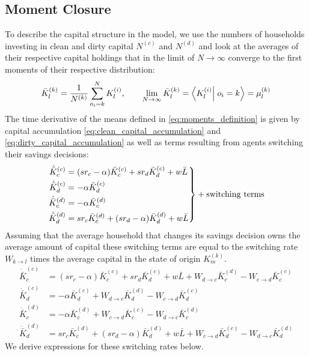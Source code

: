 \subsection{Moment Closure}

To describe the capital structure in the model, we use the numbers of households investing in clean and dirty capital $N^{(c)}$ and $N^{(d)}$ and look at the averages of their respective capital holdings that in the limit of $N \rightarrow \infty$ converge to the first moments of their respective distribution:
\begin{align}
	\bar{K}_l^{(k)} = \frac{1}{N^{(k)}}\sum_{o_i=k}^{N}K_l^{(i)}, \qquad \lim_{N \rightarrow \infty} \bar{K}_{l}^{(k)} = \braket{K_l^{(i)}}{o_i = k} = \mu_l^{(k)}
	\label{eq:moments_definition}
\end{align}
The time derivative of the means defined in \eqref{eq:moments_definition} is given by capital accumulation \eqref{eq:clean_capital_accumulation} and \eqref{eq:dirty_capital_accumulation} as well as terms resulting from agents switching their savings decisions: 
\begin{equation}
\left.  \begin{aligned}
		\dot{\bar{K}}_c^{(c)} &= (sr_c - \alpha)\bar{K}_c^{(c)} + s r_d \bar{K}_d^{(c)} + w \bar{L} \nonumber \\
		\dot{\bar{K}}_d^{(c)} &= - \alpha\bar{K}_d^{(c)} \nonumber \\
		\dot{\bar{K}}_c^{(d)} &= - \alpha\bar{K}_c^{(d)} \nonumber \\
		\dot{\bar{K}}_d^{(d)} &= sr_c \bar{K}_c^{(d)} + (s r_d - \alpha)\bar{K}_d^{(d)} + w \bar{L} \nonumber
	\end{aligned} \right\} + \rm{switching\ terms}
\end{equation}
Assuming that the average household that changes its savings decision owns the average amount of capital these switching terms are equal to the switching rate $W_{k \rightarrow l}$ times the average capital in the state of origin $K_m^{(k)}$.
\begin{align}
	\dot{\bar{K}}_c^{(c)} &= (sr_c - \alpha)\bar{K}_c^{(c)} + s r_d \bar{K}_d^{(c)} + w \bar{L} + W_{d \rightarrow c} \bar{K}_c^{(d)} - W_{c \rightarrow d} \bar{K}_c^{(c)} \nonumber \\
	\dot{\bar{K}}_d^{(c)} &= - \alpha\bar{K}_d^{(c)} + W_{d \rightarrow c} \bar{K}_d^{(d)} - W_{c \rightarrow d} \bar{K}_d^{(c)} \nonumber \\
	\dot{\bar{K}}_c^{(d)} &= - \alpha\bar{K}_c^{(d)} + W_{c \rightarrow d} \bar{K}_c^{(c)} - W_{d \rightarrow c} \bar{K}_c^{(d)} \nonumber \\
	\dot{\bar{K}}_d^{(d)} &= sr_c \bar{K}_c^{(d)} + (s r_d - \alpha)\bar{K}_d^{(d)} + w \bar{L} + W_{c \rightarrow d} \bar{K}_d^{(c)} - W_{d \rightarrow c} \bar{K}_d^{(d)}
	\label{eq:mean_capital_stocks}
\end{align}
We derive expressions for these switching rates below.
